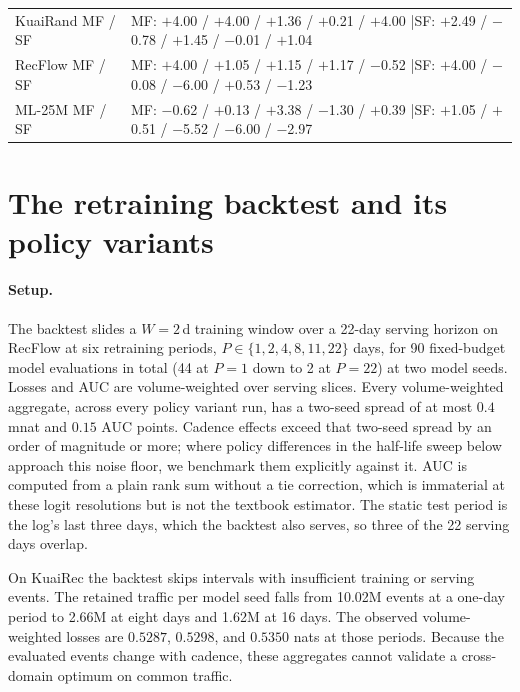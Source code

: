 \documentclass[10pt,letterpaper]{article}
\begin{document}
\begin{table}[t]
\begin{tabular}{llrrrrrr}
\multicolumn{2}{l}{KuaiRand MF / SF} & \multicolumn{6}{l}{MF: $+$4.00 / $+$4.00 / $+$1.36 / $+$0.21 / $+$4.00 \quad|\quad SF: $+$2.49 / $-$0.78 / $+$1.45 / $-$0.01 / $+$1.04} \\
\multicolumn{2}{l}{RecFlow MF / SF}  & \multicolumn{6}{l}{MF: $+$4.00 / $+$1.05 / $+$1.15 / $+$1.17 / $-$0.52 \quad|\quad SF: $+$4.00 / $-$0.08 / $-$6.00 / $+$0.53 / $-$1.23} \\
\multicolumn{2}{l}{ML-25M MF / SF}   & \multicolumn{6}{l}{MF: $-$0.62 / $+$0.13 / $+$3.38 / $-$1.30 / $+$0.39 \quad|\quad SF: $+$1.05 / $+$0.51 / $-$5.52 / $-$6.00 / $-$2.97} \\
\bottomrule
\end{tabular}
\end{table}

\section{The retraining backtest and its policy variants}
\label{sup:backtest}

\paragraph{Setup.}
The backtest slides a $W = 2$\,d training window over a 22-day serving
horizon on RecFlow at six retraining periods,
$P \in \{1, 2, 4, 8, 11, 22\}$ days, for 90 fixed-budget model evaluations
in total (44 at $P = 1$ down to 2 at $P = 22$) at two model seeds. Losses
and AUC are volume-weighted over serving slices. Every volume-weighted
aggregate, across every policy variant run, has a two-seed spread of at most
$0.4$\,mnat and $0.15$ AUC points. Cadence effects exceed that two-seed spread
by an order of magnitude or more; where policy differences in the half-life
sweep below approach this noise floor, we benchmark them explicitly against it.
AUC is computed from a plain rank sum without a tie correction, which is
immaterial at these logit resolutions but is not the textbook estimator. The
static test period is the log's last three days, which the backtest also
serves, so three of the 22 serving days overlap.

On KuaiRec the backtest skips intervals with insufficient training or
serving events. The retained traffic per model seed falls from 10.02M
events at a one-day period to 2.66M at eight days and 1.62M at 16 days.
The observed volume-weighted losses are $0.5287$, $0.5298$, and $0.5350$ nats
at those periods. Because the evaluated events change with cadence, these
aggregates cannot validate a cross-domain optimum on common traffic.
\end{document}
